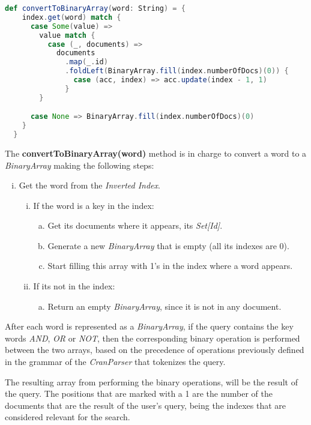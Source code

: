 \documentclass{article}
\begin{document}
\begin{lstlisting}[language=Scala]
def convertToBinaryArray(word: String) = {
    index.get(word) match {
      case Some(value) =>
        value match {
          case (_, documents) =>
            documents
              .map(_.id)
              .foldLeft(BinaryArray.fill(index.numberOfDocs)(0)) {                
                case (acc, index) => acc.update(index - 1, 1)
              }
        }

      case None => BinaryArray.fill(index.numberOfDocs)(0)
    }
  }
\end{lstlisting}

The \textbf{convertToBinaryArray(word)} method is in charge to convert a word to a \textit{BinaryArray} making the following steps:

\begin{enumerate}[(i)]
	\item Get the word from the \textit{Inverted Index}.
	\begin{enumerate}[(i)]
		\item If the word is a key in the index:
	\begin{enumerate}[(a)]
		\item Get its documents where it appears, its \textit{Set[Id]}.
		\item Generate a new \textit{BinaryArray} that is empty (all its indexes are 0).
		\item Start filling this array with 1's in the index where a word appears.
	\end{enumerate}
	\item If its not in the index:
	\begin{enumerate}[(a)]
		\item Return an empty \textit{BinaryArray}, since it is not in any document.
		
	\end{enumerate}
	\end{enumerate}
\end{enumerate}

After each word is represented as a \textit{BinaryArray}, if the query contains the key words \textit{AND}, \textit{OR} or \textit{NOT}, then the corresponding binary operation is performed between the two arrays, based on the precedence of operations previously defined in the grammar of the \textit{CranParser} that tokenizes the query.

The resulting array from performing the binary operations, will be the result of the query. The positions that are marked with a 1 are the number of the documents that are the result of the user's query, being the indexes that are considered relevant for the search.
\end{document}
